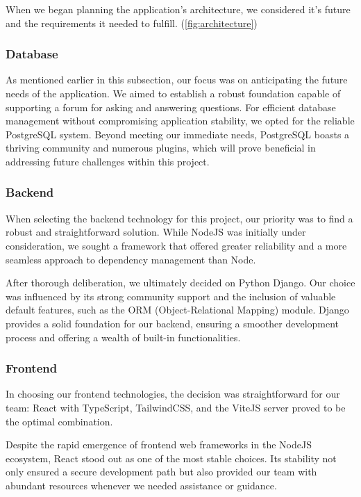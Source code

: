 \documentclass[12pt,a4paper]{article}
\begin{document}
\begin{spacing}{1.5}
    When we began planning the application's architecture, we considered it's
    future and the requirements it needed to fulfill. (\autoref{fig:architecture})

    \subsubsection{Database}
    As mentioned earlier in this subsection, our focus was on anticipating the
    future needs of the application. We aimed to establish a robust foundation
    capable of supporting a forum for asking and answering questions. For efficient
    database management without compromising application stability, we opted for
    the reliable PostgreSQL system. Beyond meeting our immediate needs, PostgreSQL
    boasts a thriving community and numerous plugins, which will prove beneficial
    in addressing future challenges within this project.

    \subsubsection{Backend}
    When selecting the backend technology for this project, our priority was to
    find a robust and straightforward solution. While NodeJS was initially under
    consideration, we sought a framework that offered greater reliability and a
    more seamless approach to dependency management than Node.

    After thorough deliberation, we ultimately decided on Python Django. Our choice
    was influenced by its strong community support and the inclusion of valuable
    default features, such as the ORM (Object-Relational Mapping) module. Django
    provides a solid foundation for our backend, ensuring a smoother development
    process and offering a wealth of built-in functionalities.

    \subsubsection{Frontend}
    In choosing our frontend technologies, the decision was straightforward for our
    team: React with TypeScript, TailwindCSS, and the ViteJS server proved to be
    the optimal combination.

    Despite the rapid emergence of frontend web frameworks in the NodeJS ecosystem,
    React stood out as one of the most stable choices. Its stability not only
    ensured a secure development path but also provided our team with abundant
    resources whenever we needed assistance or guidance.


\end{spacing}
\end{document}
